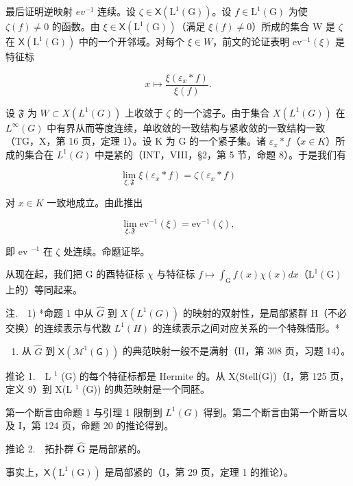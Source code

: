 最后证明逆映射 \(ev^{-1}\) 连续。设 \(\zeta \in \mathsf{X}(\mathrm{L}^{1}(\mathrm{G}))\)。设 \(f \in \mathrm{L}^{1}(\mathrm{G})\) 为使 \(\zeta(f) \neq 0\) 的函数。由 \(\xi \in \mathsf{X}(\mathrm{L}^{1}(\mathrm{G}))\)（满足 \(\xi(f) \neq 0\)）所成的集合 W 是 \(\zeta\) 在 \(\mathsf{X}(\mathrm{L}^{1}(\mathrm{G}))\) 中的一个开邻域。对每个 \(\xi \in W\)，前文的论证表明 \(\mathrm{ev}^{-1}(\xi)\) 是特征标

\[
x \mapsto \frac {\xi (\varepsilon_ {x} * f)}{\xi (f)}.
\]

设 \(\mathfrak{F}\) 为 \(W \subset X(L^{1}(G))\) 上收敛于 \(\zeta\) 的一个滤子。由于集合 \(X(L^{1}(G))\) 在 \(L^{\infty}(G)\) 中有界从而等度连续，单收敛的一致结构与紧收敛的一致结构一致（TG，X，第 16 页，定理 1）。设 K 为 G 的一个紧子集。诸 \(\varepsilon_{x} * f\)（\(x \in K\)）所成的集合在 \(L^{1}(G)\) 中是紧的（INT，VIII，§2，第 5 节，命题 8）。于是我们有

\[
\lim _ {\xi , \mathfrak {F}} \xi (\varepsilon_ {x} * f) = \zeta (\varepsilon_ {x} * f)
\]

对 \(x \in K\) 一致地成立。由此推出

\[
\lim _ {\xi , \mathfrak {F}} \mathrm{ev} ^ {- 1} (\xi) = \mathrm{ev} ^ {- 1} (\zeta),
\]

即 ev \(^{-1}\) 在 \(\zeta\) 处连续。命题证毕。

从现在起，我们把 G 的酉特征标 \(\chi\) 与特征标 \(f\mapsto\int_{\mathrm{G}}f(x)\chi(x)dx\)（\(\mathrm{L}^{1}(\mathrm{G})\) 上的）等同起来。

注.　1) *命题 1 中从 \(\widehat{G}\) 到 \(X(L^{1}(G))\) 的映射的双射性，是局部紧群 H（不必交换）的连续表示与代数 \(L^{1}(H)\) 的连续表示之间对应关系的一个特殊情形。*

\begin{enumerate}
\def\labelenumi{\arabic{enumi})}
\setcounter{enumi}{1}
\tightlist
\item
  从 \(\widehat{G}\) 到 \(\mathsf{X}(\mathcal{M}^{1}(\mathsf{G}))\) 的典范映射一般不是满射（II，第 308 页，习题 14）。
\end{enumerate}

推论 1.　L \(^{1}\) (G) 的每个特征标都是 Hermite 的。从 X(Stell(G))（I，第 125 页，定义 9）到 X(L \(^{1}\) (G)) 的典范映射是一个同胚。

第一个断言由命题 1 与引理 1 限制到 \(L^{1}(G)\) 得到。第二个断言由第一个断言以及 I，第 124 页，命题 20 的推论得到。

推论 2.　拓扑群 \(\widehat{\mathbf{G}}\) 是局部紧的。

事实上，\(\mathsf{X}(\mathrm{L}^{1}(\mathrm{G}))\) 是局部紧的（I，第 29 页，定理 1 的推论）。

